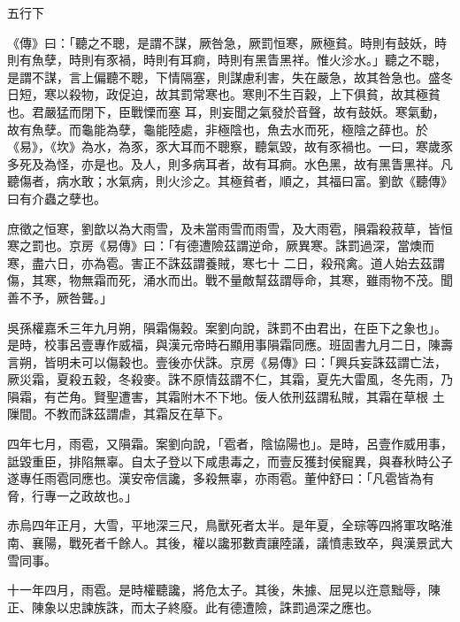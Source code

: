 
\begin{pinyinscope}

 五行下



 《傳》曰：「聽之不聰，是謂不謀，厥咎急，厥罰恒寒，厥極貧。時則有鼓妖，時則有魚孽，時則有豕禍，時則有耳痾，時則有黑眚黑祥。惟火沴水。」聽之不聰，是謂不謀，言上偏聽不聰，下情隔塞，則謀慮利害，失在嚴急，故其咎急也。盛冬日短，寒以殺物，政促迫，故其罰常寒也。寒則不生百穀，上下俱貧，故其極貧也。君嚴猛而閉下，臣戰慄而塞
 耳，則妄聞之氣發於音聲，故有鼓妖。寒氣動，故有魚孽。而龜能為孽，龜能陸處，非極陰也，魚去水而死，極陰之薛也。於《易》，《坎》為水，為豕，豕大耳而不聰察，聽氣毀，故有豕禍也。一曰，寒歲豕多死及為怪，亦是也。及人，則多病耳者，故有耳痾。水色黑，故有黑眚黑祥。凡聽傷者，病水敢；水氣病，則火沴之。其極貧者，順之，其福曰富。劉歆《聽傳》曰有介蟲之孽也。



 庶徵之恒寒，劉歆以為大雨雪，及未當雨雪而雨雪，及大雨雹，隕霜殺菽草，皆恒寒之罰也。京房《易傳》曰：「有德遭險茲謂逆命，厥異寒。誅罰過深，當燠而寒，盡六日，亦為雹。害正不誅茲謂養賊，寒七十
 二日，殺飛禽。道人始去茲謂傷，其寒，物無霜而死，涌水而出。戰不量敵幫茲謂辱命，其寒，雖雨物不茂。聞善不予，厥咎聾。」



 吳孫權嘉禾三年九月朔，隕霜傷穀。案劉向說，誅罰不由君出，在臣下之象也」。是時，校事呂壹專作威福，與漢元帝時石顯用事隕霜同應。班固書九月二日，陳壽言朔，皆明未可以傷穀也。壹後亦伏誅。京房《易傳》曰：「興兵妄誅茲謂亡法，厥災霜，夏殺五穀，冬殺麥。誅不原情茲謂不仁，其霜，夏先大雷風，冬先雨，乃隕霜，有芒角。賢聖遭害，其霜附木不下地。佞人依刑茲謂私賊，其霜在草根
 土隟間。不教而誅茲謂虐，其霜反在草下。



 四年七月，雨雹，又隕霜。案劉向說，「雹者，陰協陽也」。是時，呂壹作威用事，詆毀重臣，排陷無辜。自太子登以下咸患毒之，而壹反獲封侯寵異，與春秋時公子遂專任雨雹同應也。漢安帝信讒，多殺無辜，亦雨雹。董仲舒曰：「凡雹皆為有脅，行專一之政故也。」



 赤烏四年正月，大雪，平地深三尺，鳥獸死者太半。是年夏，全琮等四將軍攻略淮南、襄陽，戰死者千餘人。其後，權以讒邪數責讓陸議，議憤恚致卒，與漢景武大雪同事。



 十一年四月，雨雹。是時權聽讒，將危太子。其後，朱據、屈晃以迕意黜辱，陳正、陳象以忠諫族誅，而太子終廢。此有德遭險，誅罰過深之應也。




\end{pinyinscope}
